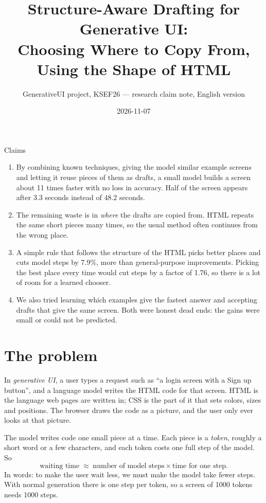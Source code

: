 \documentclass[10pt,a4paper]{article}
\title{\textbf{Structure-Aware Drafting for Generative UI:\\Choosing Where to Copy From, Using the Shape of HTML}}
\author{GenerativeUI project, KSEF26 --- research claim note, English version}
\date{2026-11-07}
\begin{document}
\maketitle

\begin{claimbox}{Claims}
\begin{enumerate}[leftmargin=1.4em,itemsep=2pt]
\item By combining known techniques, giving the model similar example screens and letting it reuse pieces of them as drafts, a small model builds a screen about 11 times faster with no loss in accuracy. Half of the screen appears after 3.3 seconds instead of 48.2 seconds.
\item The remaining waste is in \emph{where} the drafts are copied from. HTML repeats the same short pieces many times, so the usual method often continues from the wrong place.
\item A simple rule that follows the structure of the HTML picks better places and cuts model steps by 7.9\%, more than general-purpose improvements. Picking the best place every time would cut steps by a factor of 1.76, so there is a lot of room for a learned chooser.
\item We also tried learning which examples give the fastest answer and accepting drafts that give the same screen. Both were honest dead ends: the gains were small or could not be predicted.
\end{enumerate}
\end{claimbox}

\section{The problem}
In \emph{generative UI}, a user types a request such as ``a login screen with a Sign up button'', and a language model writes the HTML code for that screen. HTML is the language web pages are written in; CSS is the part of it that sets colors, sizes and positions. The browser draws the code as a picture, and the user only ever looks at that picture.

The model writes code one small piece at a time. Each piece is a \emph{token}, roughly a short word or a few characters, and each token costs one full step of the model. So
\begin{equation}
\text{waiting time} \;\approx\; \text{number of model steps} \times \text{time for one step}.
\end{equation}
In words: to make the user wait less, we must make the model take fewer steps. With normal generation there is one step per token, so a screen of 1000 tokens needs 1000 steps.
\end{document}
